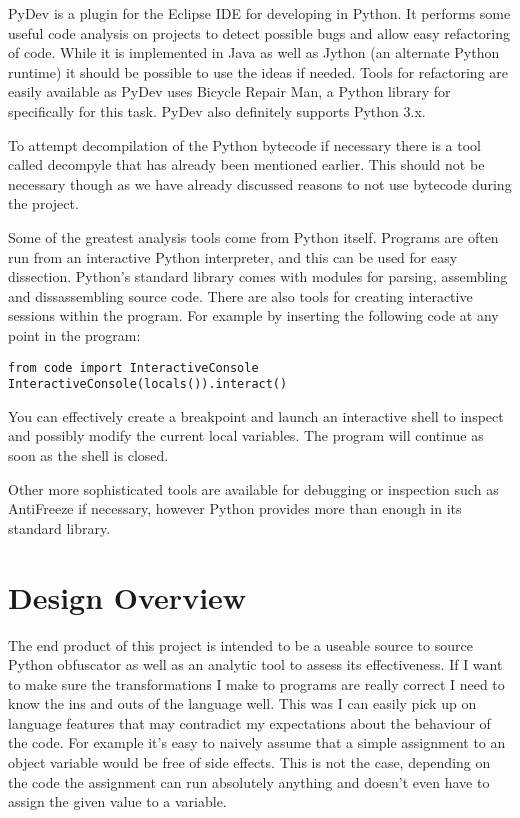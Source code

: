 \documentclass{report}
\begin{document}
PyDev\cite{pydev} is a plugin for the Eclipse IDE for developing in Python. It performs some useful code analysis on projects to detect
possible bugs and allow easy refactoring of code. While it is implemented in Java as well as Jython (an alternate Python runtime)
it should be possible to use the ideas if needed. Tools for refactoring are easily available as PyDev uses Bicycle Repair
Man\cite{bikerepair}, a Python library for specifically for this task. PyDev also definitely supports Python 3.x.

To attempt decompilation of the Python bytecode if necessary there is a tool called decompyle\cite{decompyle} that has already been
mentioned earlier. This should not be necessary though as we have already discussed reasons to not use bytecode during the project.

Some of the greatest analysis tools come from Python itself. Programs are often run from an interactive Python interpreter, and this
can be used for easy dissection. Python's standard library comes with modules for parsing, assembling and dissassembling source code.
There are also tools for creating interactive sessions within the program. For example by inserting the following code at any point
in the program:

\begin{lstlisting}
from code import InteractiveConsole
InteractiveConsole(locals()).interact()
\end{lstlisting}

You can effectively create a breakpoint and launch an interactive shell to inspect and possibly modify the current local
variables. The program will continue as soon as the shell is closed.

Other more sophisticated tools are available for debugging or inspection such as AntiFreeze\cite{pirates} if necessary,
however Python provides more than enough in its standard library.

\section{Design Overview}

The end product of this project is intended to be a useable source to source Python obfuscator as well as an analytic tool
to assess its effectiveness. If I want to make sure the transformations I make to programs are really correct I need to
know the ins and outs of the language well. This was I can easily pick up on language features that may contradict my
expectations about the behaviour of the code. For example it's easy to naively assume that a simple assignment to an object
variable would be free of side effects. This is not the case, depending on the code the assignment can run absolutely
anything\cite{pyprop} and doesn't even have to assign the given value to a variable.
\end{document}
